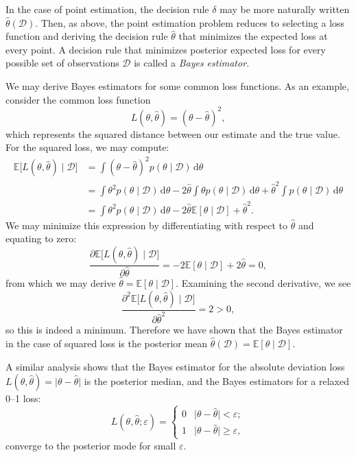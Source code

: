 \documentclass{article}
\newcommand{\given}{\mid}
\newcommand{\mc}[1]{\mathcal{#1}}
\newcommand{\data}{\mc{D}}
\newcommand{\intd}[1]{\,\mathrm{d}{#1}}
\begin{document}
In the case of point estimation, the decision rule $\delta$ may be
more naturally written $\hat{\theta}(\data)$.  Then, as above, the
point estimation problem reduces to selecting a loss function and
deriving the decision rule $\hat{\theta}$ that minimizes the expected
loss at every point.  A decision rule that minimizes posterior
expected loss for every possible set of observations $\data$ is called
a \emph{Bayes estimator.}

We may derive Bayes estimators for some common loss functions.  As an
example, consider the common loss function
\begin{equation*}
  L(\theta, \hat{\theta})
  =
  (\theta - \hat{\theta})^2,
\end{equation*}
which represents the squared distance between our estimate and the
true value.  For the squared loss, we may compute:
\begin{align*}
  \mathbb{E}\bigl[L(\theta, \hat{\theta}) \given \data \bigr]
  &=
  \int
  (\theta - \hat{\theta})^2
  p(\theta \given \data)
  \intd{\theta}
  \\
  &=
  \int
  \theta^2
  p(\theta \given \data)
  \intd{\theta}
  -
  2
  \hat{\theta}
  \int
  \theta
  p(\theta \given \data)
  \intd{\theta}
  +
  \hat{\theta}^2
  \int
  p(\theta \given \data)
  \intd{\theta}
  \\
  &=
  \int
  \theta^2
  p(\theta \given \data)
  \intd{\theta}
  -
  2
  \hat{\theta}
  \mathbb{E}[\theta \given \data]
  +
  \hat{\theta}^2
  .
\end{align*}
We may minimize this expression by differentiating with respect to
$\hat{\theta}$ and equating to zero:
\begin{equation*}
  \frac{\partial \mathbb{E}\bigl[L(\theta, \hat{\theta}) \given \data \bigr]}
       {\partial \hat{\theta}}
  =
  -2\mathbb{E}[\theta \given \data]
  +
  2\hat{\theta}
  =
  0,
\end{equation*}
from which we may derive $\hat{\theta} = \mathbb{E}[\theta \given
  \data]$.  Examining the second derivative, we see
\begin{equation*}
  \frac{\partial^2\mathbb{E}\bigl[L(\theta, \hat{\theta}) \given \data \bigr]}
       {\partial \hat{\theta}^2}
  = 2 > 0,
\end{equation*}
so this is indeed a minimum.  Therefore we have shown that the Bayes
estimator in the case of squared loss is the posterior mean
$\hat{\theta}(\data) = \mathbb{E}[\theta \given \data].$

A similar analysis shows that the Bayes estimator for the absolute
deviation loss $L(\theta, \hat{\theta}) = \lvert \theta - \hat{\theta}
\rvert$ is the posterior median, and the Bayes estimators for a
relaxed 0--1 loss:
\begin{equation*}
  L(\theta, \hat{\theta}; \varepsilon)
  =
  \begin{cases}
    0 & \lvert \theta - \hat{\theta} \rvert   < \varepsilon; \\
    1 & \lvert \theta - \hat{\theta} \rvert \geq \varepsilon,
  \end{cases}
\end{equation*}
converge to the posterior mode for small $\varepsilon$.
\end{document}
